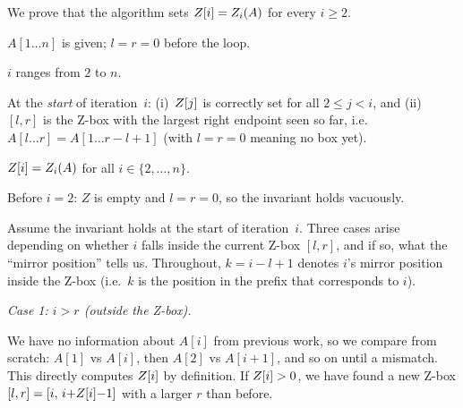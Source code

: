 \begin{formaldetails}
  We prove that the algorithm sets $Z\kern0pt[i] = Z_i(A)$ for every $i \ge 2$.

  \begin{loopproof}
    \item[Precondition]  $A[1\ldots n]$ is given; $l = r = 0$ before the loop.
    \item[Loop guard]    $i$ ranges from $2$ to $n$.
    \item[Invariant]     At the \emph{start} of iteration~$i$:
                         (i)~$Z\kern0pt[j]$ is correctly set for all $2 \le j < i$, and
                         (ii)~$[l, r]$ is the Z-box with the largest right endpoint
                         seen so far, i.e.\ $A[l\ldots r] = A[1\ldots r{-}l{+}1]$
                         (with $l = r = 0$ meaning no box yet).
    \item[Postcondition] $Z\kern0pt[i] = Z_i(A)$ for all $i \in \{2, \ldots, n\}$.
  \end{loopproof}

  \lprulesep

  \begin{loopproof}
    \item[Base case]     Before $i = 2$: $Z$ is empty and $l = r = 0$, so the
                         invariant holds vacuously. \checkmark

    \item[Preservation]  Assume the invariant holds at the start of iteration~$i$.
                         Three cases arise depending on whether $i$ falls inside
                         the current Z-box $[l, r]$, and if so, what the
                         ``mirror position'' tells us.
                         Throughout, $k = i - l + 1$ denotes $i$'s mirror
                         position inside the Z-box (i.e.\ $k$ is the position
                         in the prefix that corresponds to $i$).

                         \medskip
                         \textit{Case 1: $i > r$ (outside the Z-box).}

                         We have no information about $A[i]$ from previous
                         work, so we compare from scratch:
                         $A[1]$ vs $A[i]$, then $A[2]$ vs $A[i{+}1]$, and so
                         on until a mismatch.
                         This directly computes $Z\kern0pt[i]$ by definition.
                         If $Z\kern0pt[i] > 0$, we have found a new Z-box
                         $[l, r] = [i,\, i{+}Z\kern0pt[i]{-}1]$ with a larger
                         $r$ than before. \checkmark


\end{loopproof}
\end{formaldetails}

